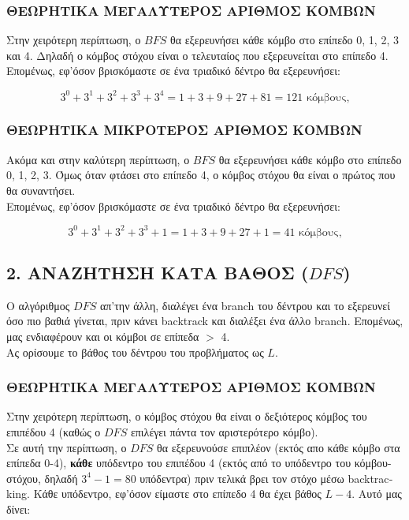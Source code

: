 \documentclass{article}
\begin{document}
\subsubsection*{ΘΕΩΡΗΤΙΚΑ ΜΕΓΑΛΥΤΕΡΟΣ ΑΡΙΘΜΟΣ ΚΟΜΒΩΝ}
Στην χειρότερη περίπτωση, ο \(BFS\) θα εξερευνήσει κάθε κόμβο στο επίπεδο 0, 1, 2, 3 και 4. Δηλαδή ο κόμβος στόχου είναι ο τελευταίος που εξερευνείται στο επίπεδο 4.\\
Επομένως, εφ'όσον βρισκόμαστε σε ένα τριαδικό δέντρο θα εξερευνήσει:

\[3^0 + 3^1+3^2+3^3+3^4 = 1 + 3 + 9 + 27 + 81 = 121 \text{ κόμβους,}\]

\subsubsection*{ΘΕΩΡΗΤΙΚΑ ΜΙΚΡΟΤΕΡΟΣ ΑΡΙΘΜΟΣ ΚΟΜΒΩΝ}
Ακόμα και στην καλύτερη περίπτωση, ο \(BFS\) θα εξερευνήσει κάθε κόμβο στο επίπεδο 0, 1, 2, 3. Όμως όταν φτάσει στο επίπεδο 4, ο κόμβος στόχου θα είναι ο πρώτος που θα συναντήσει. \\
Επομένως, εφ'όσον βρισκόμαστε σε ένα τριαδικό δέντρο θα εξερευνήσει:

\[3^0 + 3^1+3^2+3^3+1 = 1 + 3 + 9 + 27 + 1 = 41 \text{ κόμβους,}\]

\subsection*{2. ΑΝΑΖΗΤΗΣΗ ΚΑΤΑ ΒΑΘΟΣ (\(DFS\))}
Ο αλγόριθμος \(DFS\) απ'την άλλη, διαλέγει ένα \textlatin{branch} του δέντρου και το εξερευνεί όσο πιο βαθιά γίνεται, πριν κάνει backtrack και διαλέξει ένα άλλο branch. Επομένως, μας ενδιαφέρουν και οι κόμβοι σε επίπεδα \(>\) 4.\\
Ας ορίσουμε το βάθος του δέντρου του προβλήματος ως \(L\).

\subsubsection*{ΘΕΩΡΗΤΙΚΑ ΜΕΓΑΛΥΤΕΡΟΣ ΑΡΙΘΜΟΣ ΚΟΜΒΩΝ}
Στην χειρότερη περίπτωση, ο κόμβος στόχου θα είναι ο δεξιότερος κόμβος του επιπέδου 4 (καθώς ο \(DFS\) επιλέγει πάντα τον αριστερότερο κόμβο). \\
Σε αυτή την περίπτωση, ο \(DFS\) θα εξερευνούσε επιπλέον (εκτός απο κάθε κόμβο στα επίπεδα 0-4), \textbf{κάθε} υπόδεντρο του επιπέδου 4 (εκτός από το υπόδεντρο του κόμβου-στόχου, δηλαδή \(3^4 -1 = 80 \) υπόδεντρα) πριν τελικά βρει τον στόχο μέσω \textlatin{backtracking}. Κάθε υπόδεντρο, εφ'όσον είμαστε στο επίπεδο 4 θα έχει βάθος \(L-4\). Αυτό μας δίνει:
\end{document}
